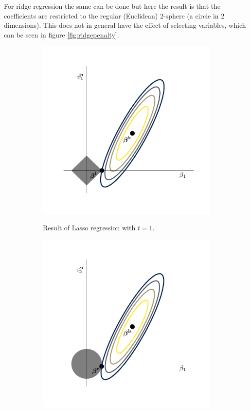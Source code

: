 \documentclass[a4paper, 12pt]{scrartcl}
\begin{document}
For ridge regression the same can be done but here the result is that the coefficients are restricted to the regular (Euclidean) 2-sphere (a circle in 2 dimensions).
This does not in general have the effect of selecting variables, which can be seen in figure \ref{fig:ridgepenalty}.

\begin{figure}[h]
	\begin{subfigure}{.5\textwidth}
		\centering
		\includegraphics[width=.8\linewidth, clip, trim={10mm 10mm 10mm 10mm}]{Figure1.pdf}
		\label{fig:lassopenalty}
		\caption{Result of Lasso regression with $t=1$.}
	\end{subfigure}
	\begin{subfigure}{.5\textwidth}
		\centering
		\includegraphics[width=.8\linewidth, clip, trim={10mm 10mm 10mm 10mm}]{Figure2.pdf}

\end{subfigure}
\end{figure}
\end{document}
